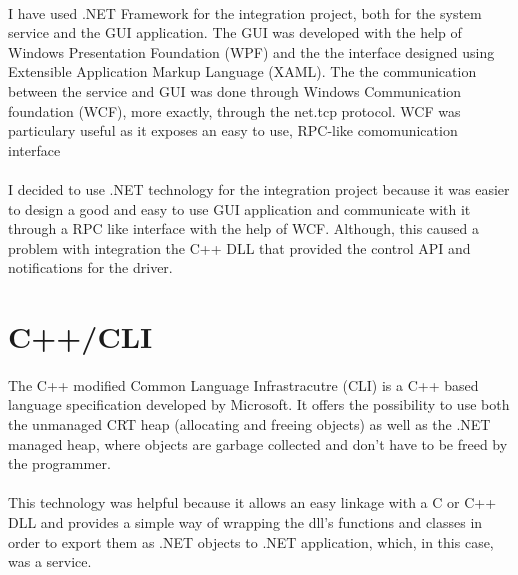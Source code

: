         \paragraph{}
        I have used .NET Framework for the integration project, both for the system service and the GUI application. The GUI was developed with
        the help of Windows Presentation Foundation (WPF) and the the interface designed using Extensible Application Markup Language (XAML). The
        the communication between the service and GUI was done through Windows Communication foundation (WCF), more exactly, through the
        net.tcp protocol. WCF was particulary useful as it exposes an easy to use, RPC-like comomunication interface

        \paragraph{}
        I decided to use .NET technology for the integration project because it was easier to design a good and easy to use GUI application and
        communicate with it through a RPC like interface with the help of WCF. Although, this caused a problem with integration the C++ DLL that
        provided the control API and notifications for the driver.

    \section{C++/CLI}
        \paragraph{}
        The C++ modified Common Language Infrastracutre (CLI) is a C++ based language specification developed by Microsoft. It offers the possibility
        to use both the unmanaged CRT heap (allocating and freeing objects) as well as the .NET managed heap, where objects are garbage collected
        and don't have to be freed by the programmer.
        
        \paragraph{}
        This technology was helpful because it allows an easy linkage with a C or C++ DLL and provides a simple way of wrapping the dll's
        functions and classes in order to export them as .NET objects to .NET application, which, in this case, was a service.
    
